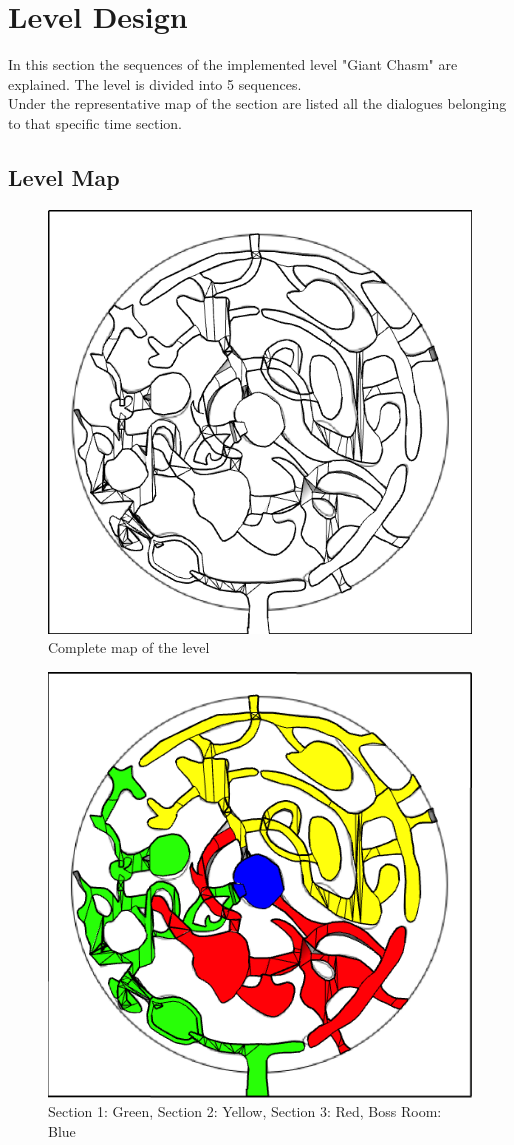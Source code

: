 \section{Level Design}
In this section the sequences of the implemented level "Giant Chasm" are explained. The level is divided into 5 sequences.\\
Under the representative map of the section are listed all the dialogues belonging to that specific time section.

\subsection{Level Map}

\begin{figure}[H]
	\centering
	\includegraphics[width=0.8\linewidth]{images/map/map.png}
	\caption*{Complete map of the level}
\end{figure}

\begin{figure}[H]
	\centering
	\includegraphics[width=0.8\linewidth]{images/map/map_all_sections.png}
	\caption*{Section 1: Green, Section 2: Yellow, Section 3: Red, Boss Room: Blue}
\end{figure}



